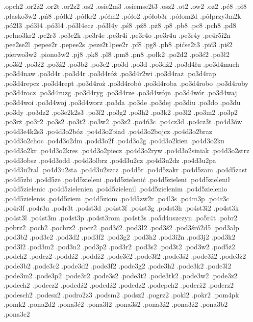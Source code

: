 {.opch2
.or2\.z2
.or2t\ke
.or2z2
.os2
.osie2m3
.osiemse2t3
.osz2
.ot2
.ow2
.oz2
.p\'c8
.p\l 8
.p\l asko3w2
.p\'n8
.p\'o\l k2
.p\'o\l kr2
.p\'o\l m2
.p\'o\l o2
.p\'o\l ob3r
.p\'o\l om2d
.p\'o\l przy3m2k
.p\'o2\l 3
.p\'o3\l 4\ka
.p\'o3\l 4\ke
.p\'o3\l 4ecz
.p\'o3\l 4y
.p\'s8
.p\'z8
.p\.z8
.p8
.pb8
.pc8
.pch8
.pd8
.pe\l no3kr2
.pe2r3
.pe3c2k
.pe3r4e
.pe3r4i
.pe3r4o
.pe3r4u
.pe3r4y
.pe4r5i2n
.pee2se2l
.pepee2r
.pepee2s
.peze2t1pee2r
.pf8
.pg8
.ph8
.pi\ke\'cse2t3
.pi\'c3
.pi\'s2
.pierwo3w2
.piono3w2
.pj8
.pk8
.pl8
.pm8
.pn8
.po\l k2
.po2d2
.po3\'c2
.po3\l 2
.po3\'s2
.po3\'z2
.po3\.z2
.po3b2
.po3c2
.po3d\ka
.po3d\ke
.po3d\'z2
.po3d4\l u
.po3d4much
.po3d4naw
.po3d4r\kecz
.po3d4r\ketw
.po3d4r\'o\.z
.po3d4r2wi
.po3d4ra\.z
.po3d4rap
.po3d4repcz
.po3d4rept
.po3d4ro\.z
.po3d4rob\'o
.po3d4roba
.po3d4robo
.po3d4roby
.po3d4rocz
.po3d4ruzg
.po3d4ryg
.po3d4rze
.po3d4w\'ojn
.po3d4w\'or
.po3d4waj
.po3d4woi
.po3d4woj
.po3d4worz
.po3da
.po3de
.po3dej
.po3diu
.po3do
.po3du
.po3dy
.po3dz2
.po3e2k2s3
.po3f2
.po3g2
.po3h2
.po3k2
.po3l2
.po3m2
.po3p2
.po3r\.z
.po3r2
.po3s2
.po3t2
.po3w2
.po3z2
.po4\'n3c
.po4cz3d
.po4cz3t
.po4d3\'ow
.po4d3e4k2s3
.po4d3o2b\'oz
.po4d3o2biad
.po4d3o2bojcz
.po4d3o2braz
.po4d3o2choc
.po4d3o2dm
.po4d3o2f
.po4d3o2g
.po4d3o2kien
.po4d3o2kn
.po4d3o2kr\keg
.po4d3o2kres
.po4d3o2piecz
.po4d3o2ryw
.po4d3o2siniak
.po4d3o2strz
.po4d3obsz
.po4d3odd
.po4d3olbrz
.po4d3u2cz
.po4d3u2dz
.po4d3u2pa
.po4d3u2ral
.po4d3u2sta
.po4d3u2szcz
.po4d5r\keczn
.po4d5zakr
.po4d5zam
.po4d5zast
.po4d5zbi
.po4d5ze
.po4d5zieleni\ka
.po4d5zieleni\'c
.po4d5zieleni\ke
.po4d5zieleni\l 
.po4d5zielenic
.po4d5zielenien
.po4d5zielenil
.po4d5zielenim
.po4d5zielenio
.po4d5zielenis
.po4d5ziem
.po4d5ziom
.po4d5zw2r
.po4l3s
.po4m3p
.po4r3c
.po4r3f
.po4r3n
.po4r3t
.po4st3d
.po4st3f
.po4st3g
.po4st3h
.po4st3i2
.po4st3k
.po4st3l
.po4st3m
.po4st3p
.po4st3rom
.po4st3s
.po5d4uszczyn
.po5r4t\ke
.pobr2
.pobrz2
.poch2
.pochrz2
.pocz2
.pod3\'c2
.pod3\l 2
.pod3\'s2
.pod3\'sr\'o2d5
.pod3alp
.pod3b2
.pod3c2
.pod3d2
.pod3f2
.pod3g2
.pod3h2
.pod3i2n
.pod3j2
.pod3k2
.pod3l2
.pod3m2
.pod3n2
.pod3p2
.pod3r2
.pod3s2
.pod3t2
.pod3w2
.pod5\.z2
.podch2
.podcz2
.podd\'z2
.podd\.z2
.pode3\'c2
.pode3\l 2
.pode3\'s2
.pode3\'z2
.pode3\.z2
.pode3b2
.pode3c2
.pode3d2
.pode3f2
.pode3g2
.pode3h2
.pode3k2
.pode3l2
.pode3m2
.pode3p2
.pode3r2
.pode3s2
.pode3t2
.pode3tk2
.pode3w2
.pode3z2
.podech2
.podecz2
.poded\'z2
.poded\.z2
.podedz2
.podepch2
.poder\.z2
.poderz2
.podesch2
.podesz2
.podro2z3
.podsm2
.podsz2
.pogrz2
.pokl2
.pokr2
.pom4pk
.pomk2
.pona2d2
.pona3\'c2
.pona3\l 2
.pona3\'s2
.pona3\'z2
.pona3\.z2
.pona3b2
.pona3c2
}
